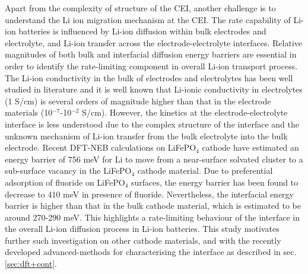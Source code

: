 \documentclass[../main.tex]{subfiles}
\begin{document}
Apart from the complexity of structure of the CEI, another challenge is to understand the Li ion migration mechanism at the CEI. The rate capability of Li-ion batteries is influenced by Li-ion diffusion within bulk electrodes and electrolyte, and Li-ion transfer across the electrode-electrolyte interfaces. Relative magnitudes of both bulk and interfacial diffusion energy barriers are essential in order to identify the rate-limiting component in overall Li-ion transport process. The Li-ion conductivity in the bulk of electrodes and electrolytes has been well studied in literature and it is well known that Li-ionic conductivity in electrolytes (1 S/cm) is several orders of magnitude higher than that in the electrode materials (10$^{-7}$-10$^{-2}$ S/cm).\cite{Park2010, VanDerVen2013} However, the kinetics at the electrode-electrolyte interface is less understood due to the complex structure of the interface and the unknown mechanism of Li-ion transfer from the bulk electrolyte into the bulk electrode. Recent DFT-NEB calculations on LiFePO$_4$ cathode have estimated an energy barrier of 756 meV for Li to move from a near-surface solvated cluster to a sub-surface vacancy in the LiFePO$_4$ cathode material.\cite{Bhandari2019} Due to preferential adsorption of fluoride on LiFePO$_4$ surfaces,\cite{Edstrom2004, Bhandari2020} the energy barrier has been found to decrease to 410 meV in presence of fluoride. Nevertheless, the interfacial energy barrier is higher than that in the bulk cathode material, which is estimated to be around 270-290 meV.\cite{Morgan2004,Dathar2011} This highlights a rate-limiting behaviour of the interface in the overall Li-ion diffusion process in Li-ion batteries. This study motivates further such investigation on other cathode materials, and with the recently developed advanced-methods for characterising the interface as described in sec. \ref{sec:dft+cont}.  
\end{document}
